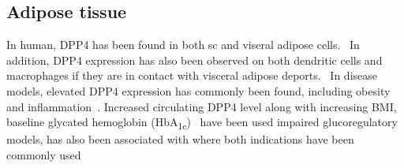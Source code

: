\subsection{Adipose tissue}
In human, DPP4 has been found in both sc and viseral adipose cells.~\cite{Lamers2011} In addition, DPP4 expression has also been observed on both dendritic cells and macrophages if they are in contact with visceral adipose deports.~\cite{Zhong2013} In disease models, elevated DPP4 expression has commonly been found, including obesity and inflammation~\cite{Zhong2013}. Increased circulating DPP4 level along with increasing BMI, baseline glycated hemoglobin (HbA\textsubscript{1c})~\cite{2011} have been used impaired glucoregulatory models,  has also been associated with where both indications have been commonly used 